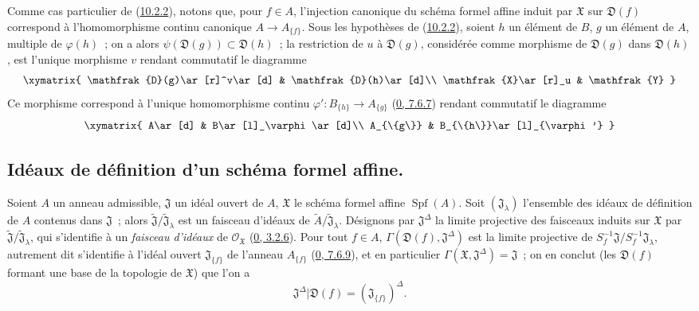 \begin{env}[10.2.3]
\label{I.10.2.3-fr}
Comme cas particulier de (\hyperref[I.10.2.2-fr]{10.2.2}), notons que, pour
$f\in A$, l'injection canonique du schéma formel affine induit par
$\mathfrak{X}$ sur $\mathfrak{D}(f)$ correspond à l'homomorphisme continu
canonique $A\to A_{\{f\}}$. Sous les hypothèses de
(\hyperref[I.10.2.2-fr]{10.2.2}), soient $h$ un élément de $B$, $g$ un
élément de $A$, multiple de $\varphi(h)$~; on a alors
$\psi(\mathfrak{D}(g))\subset\mathfrak{D}(h)$~; la restriction de $u$ à
$\mathfrak{D}(g)$, considérée comme morphisme de $\mathfrak{D}(g)$ dans
$\mathfrak{D}(h)$, est l'unique morphisme $v$ rendant commutatif le
diagramme
\[
  \xymatrix{
    \mathfrak{D}(g)\ar[r]^v\ar[d] &
    \mathfrak{D}(h)\ar[d]\\
    \mathfrak{X}\ar[r]_u &
    \mathfrak{Y}
  }
\]
Ce morphisme correspond à l'unique homomorphisme continu
$\varphi':B_{\{h\}}\to A_{\{g\}}$
(\hyperref[0.7.6.7-fr]{0, 7.6.7}) rendant commutatif le diagramme
\[
  \xymatrix{
    A\ar[d] &
    B\ar[l]_\varphi\ar[d]\\
    A_{\{g\}} &
    B_{\{h\}}\ar[l]_{\varphi'}
  }
\]
\end{env}

\subsection{Idéaux de définition d'un schéma formel affine.}
\label{subsection:I.10.3-fr}

\begin{env}[10.3.1]
\label{I.10.3.1-fr}
Soient $A$ un anneau admissible, $\mathfrak{J}$ un idéal ouvert de $A$,
$\mathfrak{X}$ le schéma formel affine $\operatorname{Spf}(A)$. Soit
$(\mathfrak{J}_\lambda)$ l'ensemble des idéaux de définition de $A$
contenus dans $\mathfrak{J}$~; alors
$\widetilde{\mathfrak{J}}/\widetilde{\mathfrak{J}}_\lambda$ est un
faisceau d'idéaux de
$\widetilde{A}/\widetilde{\mathfrak{J}}_\lambda$. Désignons par
$\mathfrak{J}^\Delta$ la limite projective des faisceaux induits sur
$\mathfrak{X}$ par
$\widetilde{\mathfrak{J}}/\widetilde{\mathfrak{J}}_\lambda$, qui
s'identifie à un \emph{faisceau d'idéaux} de
$\mathscr{O}_{\mathfrak{X}}$ (\hyperref[0.3.2.6-fr]{0, 3.2.6}). Pour tout
$f\in A$, $\Gamma(\mathfrak{D}(f),\mathfrak{J}^\Delta)$ est la limite
projective de
$S_f^{-1}\mathfrak{J}/S_f^{-1}\mathfrak{J}_\lambda$, autrement dit
s'identifie à l'idéal ouvert $\mathfrak{J}_{\{f\}}$ de l'anneau
$A_{\{f\}}$ (\hyperref[0.7.6.9-fr]{0, 7.6.9}), et en particulier
$\Gamma(\mathfrak{X},\mathfrak{J}^\Delta)=\mathfrak{J}$~; on en conclut
(les $\mathfrak{D}(f)$ formant une base de la topologie de $\mathfrak{X}$)
que l'on a
\[
  \mathfrak{J}^\Delta|\mathfrak{D}(f)
  =(\mathfrak{J}_{\{f\}})^\Delta.
  \tag{10.3.1.1}\label{I.10.3.1.1-fr}
\]
\end{env}

